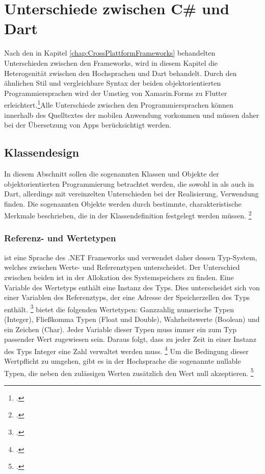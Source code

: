 \chapter{Unterschiede zwischen C\# und Dart}
\label{chap:Programmiersprachen}

Nach den in Kapitel \ref{chap:CrossPlattformFrameworks} behandelten Unterschieden zwischen den Frameworks, wird in diesem Kapitel die Heterogenität zwischen den Hochsprachen \Csharp{} und Dart behandelt.  Durch den ähnlichen Stil und vergleichbare Syntax der beiden objektorientierten Programmiersprachen wird der Umstieg von Xamarin.Forms zu Flutter erleichtert.\footcite[Vgl. ][Abgerufen am \today]{Pedley2019}Alle Unterschiede zwischen den Programmiersprachen können innerhalb des Quelltextes der mobilen Anwendung vorkommen und müssen daher bei der Übersetzung von Apps berücksichtigt werden.

\section{Klassendesign}
In diesem Abschnitt sollen die sogenannten Klassen und Objekte der objektorientierten Programmierung betrachtet werden, die sowohl in \Csharp{} als auch in Dart, allerdings mit vereinzelten Unterschieden bei der Realisierung, Verwendung finden. Die sogenannten Objekte werden durch bestimmte,  charakteristische Merkmale beschrieben,  die in der Klassendefinition festgelegt werden müssen. \footcite[Vgl.][S. 11f.]{Witte2013}

\subsection{Referenz- und Wertetypen}
\Csharp{} ist eine Sprache des \glq .NET Frameworks\grq{} und verwendet daher dessen Typ-System,  welches zwischen Werte- und Referenztypen unterscheidet.  Der Unterschied zwischen beiden ist in der Allokation des Systemspeichers zu finden.  Eine Variable des Wertetyps enthält eine Instanz des Typs.  Dies unterscheidet sich von einer Variablen des Referenztyps, der eine Adresse der Speicherzellen des Typs enthält. \footcite[Vgl.][S. 155f.]{Kühnel2019} \Csharp{} bietet die folgenden Wertetypen: Ganzzahlig numerische Typen (Integer),  Fließkomma  Typen (Float und Double),  Wahrheitswerte (Boolean) und ein Zeichen (Char).  Jeder Variable dieser Typen muss immer ein zum Typ passender Wert zugewiesen sein.  Daraus folgt,  dass zu jeder Zeit in einer Instanz des Typs Integer eine Zahl verwaltet werden muss. \footcite[Vgl. ][Abgerufen am \today]{MicrosoftValueTypes2020} Um die Bedingung dieser Wertpflicht zu umgehen,  gibt es in der Hochsprache \Csharp{} die sogenannte \glq nullable\grq{} Typen,  die neben den zulässigen Werten zusätzlich den Wert \glq null\grq{} akzeptieren. \footcite[Vgl.][S. 167]{Bayer2008} 

